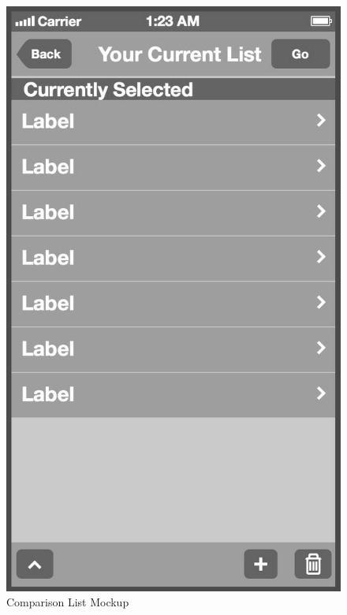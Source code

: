 \\
\begin{figure}[!b]
    \begin{minipage}[b]{0.45\linewidth}
        \centering
        \includegraphics[width=0.8025\linewidth]{figures/Screen_2_bw.jpg}
        \caption[Comparison List Screen Mockup]{Comparison List Mockup}
        \label{fig:CurrentListScreen}
    \end{minipage}
    \hspace{0.5cm}
    \begin{minipage}[b]{0.45\linewidth}
        \centering

\end{minipage}
\end{figure}

